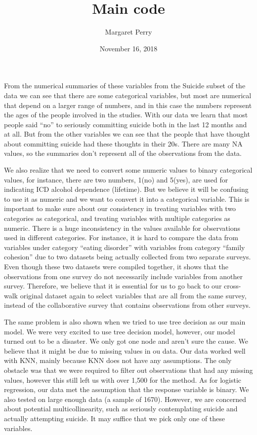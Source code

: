 \documentclass[]{article}
\title{Main code}
\author{Margaret Perry}
\date{November 16, 2018}
\begin{document}
\maketitle

From the numerical summaries of these variables from the Suicide subset
of the data we can see that there are some categorical variables, but
most are numerical that depend on a larger range of numbers, and in this
case the numbers represent the ages of the people involved in the
studies. With our data we learn that most people said ``no'' to
seriously committing suicide both in the last 12 months and at all. But
from the other variables we can see that the people that have thought
about committing suicide had these thoughts in their 20s. There are many
NA values, so the summaries don't represent all of the observations from
the data.

We also realize that we need to convert some numeric values to binary
categorical values, for instance, there are two numbers, 1(no) and
5(yes), are used for indicating ICD alcohol dependence (lifetime). But
we believe it will be confusing to use it as numeric and we want to
convert it into a categorical variable. This is important to make sure
about our consistency in treating variables with two categories as
categorical, and treating variables with multiple categories as numeric.
There is a huge inconsistency in the values available for observations
used in different categories. For instance, it is hard to compare the
data from variables under category ``eating disorder'' with variables
from category ``family cohesion'' due to two datasets being actually
collected from two separate surveys. Even though these two datasets were
compiled together, it shows that the observations from one survey do not
necessarily include variables from another survey. Therefore, we believe
that it is essential for us to go back to our cross-walk original
dataset again to select variables that are all from the same survey,
instead of the collaborative survey that contains observations from
other surveys.

The same problem is also shown when we tried to use tree decision as our
main model. We were very excited to use tree decision model, however,
our model turned out to be a disaster. We only got one node and aren't
sure the cause. We believe that it might be due to missing values in ou
data. Our data worked well with KNN, mainly because KNN does not have
any assumptions. The only obstacle was that we were required to filter
out observations that had any missing values, however this still left us
with over 1,500 for the method. As for logistic regression, our data met
the assumption that the response variable is binary. We also tested on
large enough data (a sample of 1670). However, we are concerned about
potential multicollinearity, such as seriously contemplating suicide and
actually attempting suicide. It may suffice that we pick only one of
these variables.
\end{document}
